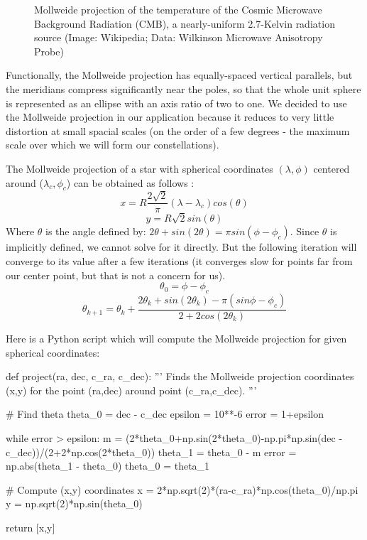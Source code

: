 \documentclass[paper=a4, fontsize=11pt]{scrartcl} %
\begin{document}
\begin{figure}
\caption{Mollweide projection of the temperature of the Cosmic Microwave Background Radiation (CMB), a nearly-uniform 2.7-Kelvin radiation source (Image: Wikipedia; Data: Wilkinson Microwave Anisotropy Probe)}
\label{moll}
\end{figure}


Functionally, the Mollweide projection has equally-spaced vertical parallels, but the meridians compress significantly near the poles, so that the whole unit sphere is represented as an ellipse with an axis ratio of two to one. We decided to use the Mollweide projection in our application because it reduces to very little distortion at small spacial scales (on the order of a few degrees - the maximum scale over which we will form our constellations).

The Mollweide projection of a star with spherical coordinates $(\lambda,\phi)$ centered around ($\lambda_c,\phi_c$) can be obtained as follows \cite{Snyder1987}:
$$
x = R\frac{2\sqrt{2}}{\pi}(\lambda-\lambda_c)cos(\theta)$$$$
y = R\sqrt{2}sin(\theta)
$$
Where $\theta$ is the angle defined by: $2\theta + sin(2\theta)=\pi sin(\phi-\phi_c)$.  Since $\theta$ is implicitly defined, we cannot solve for it directly. But the following iteration will converge to its value after a few iterations (it converges slow for points far from our center point, but that is not a concern for us).
$$
\theta_0 = \phi-\phi_c
$$$$
\theta_{k+1} = \theta_k + \frac{2\theta_k+sin(2\theta_k)-\pi(sin\phi-\phi_c)}{2+2cos(2\theta_k)}
$$

Here is a Python script which will compute the Mollweide projection for given spherical coordinates:
\begin{python}

def project(ra, dec, c_ra, c_dec):
	'''
	Finds the Mollweide projection coordinates (x,y) for the point (ra,dec) around 
	point (c_ra,c_dec).
	'''
	
	# Find theta
	theta_0 = dec - c_dec
	epsilon = 10**-6
	error = 1+epsilon
	
	while error > epsilon:
	    m = (2*theta_0+np.sin(2*theta_0)-np.pi*np.sin(dec - c_dec))/(2+2*np.cos(2*theta_0))
	    theta_1 = theta_0 - m
	    error = np.abs(theta_1 - theta_0)
	    theta_0 = theta_1
	
	# Compute (x,y) coordinates
	x = 2*np.sqrt(2)*(ra-c_ra)*np.cos(theta_0)/np.pi
	y = np.sqrt(2)*np.sin(theta_0)
	
	return [x,y]
\end{python}
\end{document}
